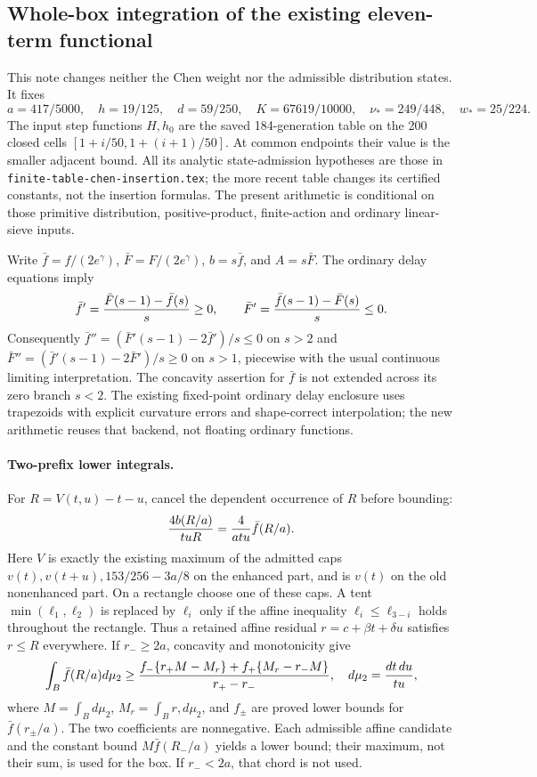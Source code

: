 \subsection{Whole-box integration of the existing eleven-term functional}
\label{sec:sharp-eleven-term-baseline}
This note changes neither the Chen weight nor the admissible distribution
states.  It fixes
\[
 a=417/5000,\quad h=19/125,\quad d=59/250,\quad K=67619/10000,
 \quad \nu_*=249/448,\quad w_*=25/224.
\]
The input step functions $H,h_0$ are the saved 184-generation table on the
200 closed cells $[1+i/50,1+(i+1)/50]$.  At common endpoints their value is
the smaller adjacent bound.  All its analytic state-admission hypotheses
are those in \texttt{finite-table-chen-insertion.tex}; the more recent
table changes its certified constants, not the insertion formulas.
The present arithmetic is conditional on those primitive distribution,
positive-product, finite-action and ordinary linear-sieve inputs.

Write $\bar f=f/(2e^\gamma)$, $\bar F=F/(2e^\gamma)$,
$b=s\bar f$, and $A=s\bar F$.  The ordinary delay equations imply
\[
 \bar f'={\bar F(s-1)-\bar f(s)\over s}\ge0,
 \qquad \bar F'={\bar f(s-1)-\bar F(s)\over s}\le0.
\]
Consequently $\bar f''=(\bar F'(s-1)-2\bar f')/s\le0$ on $s>2$
and $\bar F''=(\bar f'(s-1)-2\bar F')/s\ge0$ on $s>1$,
piecewise with the usual continuous limiting interpretation.  The
concavity assertion for $\bar f$ is not extended across its zero branch
$s<2$.  The existing fixed-point ordinary delay enclosure uses
trapezoids with explicit curvature errors and shape-correct interpolation;
the new arithmetic reuses that backend, not floating ordinary functions.

\paragraph{Two-prefix lower integrals.}
For $R=V(t,u)-t-u$, cancel the dependent occurrence of $R$ before bounding:
\begin{equation}\label{eq:sharp-pair-cancellation}
 {4b(R/a)\over tuR}={4\over a tu}\bar f(R/a).
\end{equation}
Here $V$ is exactly the existing maximum of the admitted caps
$v(t),v(t+u),153/256-3a/8$ on the enhanced part, and is $v(t)$
on the old nonenhanced part.  On a rectangle choose one of these caps.
A tent $\min(\ell_1,\ell_2)$ is replaced by $\ell_i$ only if the
affine inequality $\ell_i\le\ell_{3-i}$ holds throughout the rectangle.
Thus a retained affine residual $r=c+\beta t+\delta u$ satisfies
$r\le R$ everywhere.  If $r_-\ge2a$, concavity and monotonicity give
\begin{equation}\label{eq:sharp-pair-chord}
 \int_B\bar f(R/a)d\mu_2\ge
 { f_-\{r_+M-M_r\}+f_+\{M_r-r_-M\}\over r_+-r_-},
 \quad d\mu_2={dt\,du\over tu},
\end{equation}
where $M=\int_Bd\mu_2$, $M_r=\int_Br,d\mu_2$, and $f_\pm$ are
proved lower bounds for $\bar f(r_\pm/a)$.  The two coefficients are
nonnegative.  Each admissible affine candidate and the constant bound
$M\bar f(R_-/a)$ yields a lower bound; their maximum, not their sum,
is used for the box.  If $r_-<2a$, that chord is not used.

